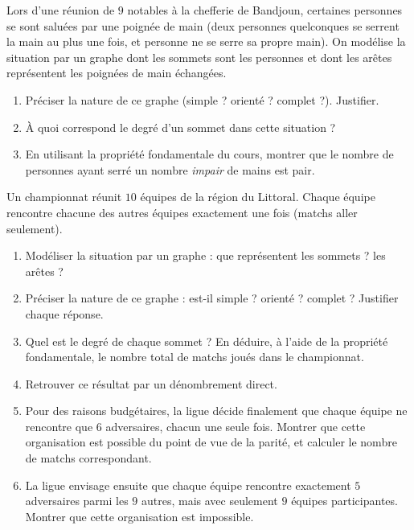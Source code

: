 \documentclass[11pt]{article}
\newcounter{popsec}
\newcounter{popsub}
\newcommand{\courssub}[1]{%
  \stepcounter{popsub}%
  \par\vspace{9pt}\noindent{\popxbold\fontsize{11.5}{13}\selectfont\color{popink}{\color{poporange}\thepopsec.\thepopsub}\hspace{6pt}#1}\par\nopagebreak\vspace{4pt}
}
\begin{document}
\begin{exercice}
Lors d'une réunion de $9$ notables à la chefferie de Bandjoun, certaines personnes se sont saluées par une poignée de main (deux personnes quelconques se serrent la main au plus une fois, et personne ne se serre sa propre main). On modélise la situation par un graphe dont les sommets sont les personnes et dont les arêtes représentent les poignées de main échangées.
\begin{enumerate}
\item Préciser la nature de ce graphe (simple ? orienté ? complet ?). Justifier.
\item À quoi correspond le degré d'un sommet dans cette situation ?
\item En utilisant la propriété fondamentale du cours, montrer que le nombre de personnes ayant serré un nombre \emph{impair} de mains est pair.
\end{enumerate}
\end{exercice}

\courssub{Je me prépare au Probatoire}

\begin{exercice}
Un championnat réunit $10$ équipes de la région du Littoral. Chaque équipe rencontre chacune des autres équipes exactement une fois (matchs aller seulement).
\begin{enumerate}
\item Modéliser la situation par un graphe : que représentent les sommets ? les arêtes ?
\item Préciser la nature de ce graphe : est-il simple ? orienté ? complet ? Justifier chaque réponse.
\item Quel est le degré de chaque sommet ? En déduire, à l'aide de la propriété fondamentale, le nombre total de matchs joués dans le championnat.
\item Retrouver ce résultat par un dénombrement direct.
\item Pour des raisons budgétaires, la ligue décide finalement que chaque équipe ne rencontre que $6$ adversaires, chacun une seule fois. Montrer que cette organisation est possible du point de vue de la parité, et calculer le nombre de matchs correspondant.
\item La ligue envisage ensuite que chaque équipe rencontre exactement $5$ adversaires parmi les $9$ autres, mais avec seulement $9$ équipes participantes. Montrer que cette organisation est impossible.
\end{enumerate}
\end{exercice}
\end{document}
